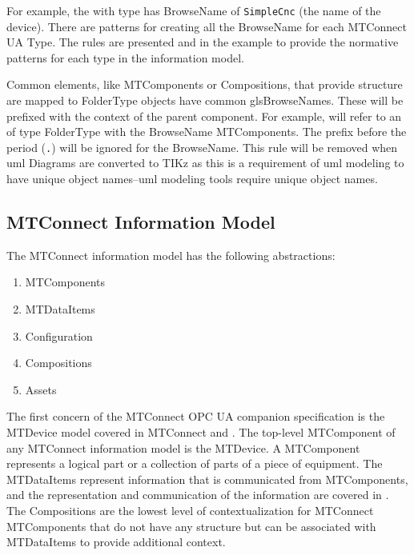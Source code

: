 For example, the with type  has \gls{BrowseName} of \texttt{SimpleCnc} (the name of the device). There are patterns for creating all the \gls{BrowseName} for each MTConnect UA Type. The rules are presented and in the example to provide the normative patterns for each type in the information model.

Common elements, like \glspl{MTComponent} or \glspl{Composition}, that provide structure are mapped to \gls{FolderType} objects have common gls{BrowseNames}. These will be prefixed with the context of the parent component. For example,  will refer to an  of type \gls{FolderType} with the \gls{BrowseName} \glspl{MTComponent}. The prefix before the period (\texttt{.}) will be ignored for the \gls{BrowseName}. {\color{red} This rule will be removed when \gls{uml} Diagrams are converted to TIKz as this is a requirement of \gls{uml} modeling to have unique object names--\gls{uml} modeling tools require unique object names.}

\FloatBarrier

\subsection{MTConnect Information Model}

The MTConnect information model has the following abstractions:

\begin{enumerate}
  \item \glspl{MTComponent}
  \item \glspl{MTDataItem}
  \item \gls{Configuration}
  \item \glspl{Composition}
  \item \glspl{Asset}
\end{enumerate}

The first concern of the MTConnect OPC UA companion specification is the \gls{MTDevice} model covered in MTConnect \cite{MTCPart2} and \cite{MTCPart3}. The top-level \gls{MTComponent} of any MTConnect information model is the \gls{MTDevice}. A \gls{MTComponent} represents a logical part or a collection of parts of a piece of equipment. The \glspl{MTDataItem} represent information that is communicated from \glspl{MTComponent}, and the representation and communication of the information are covered in \cite{MTCPart3}. The \glspl{Composition} are the lowest level of contextualization for MTConnect \glspl{MTComponent} that do not have any structure but can be associated with \glspl{MTDataItem} to provide additional context. 

